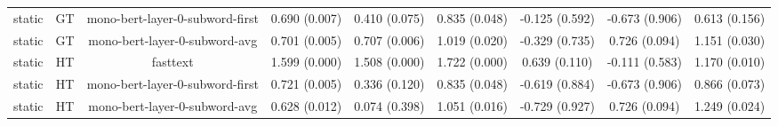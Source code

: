\begin{sidewaystable}[htb]
\begin{tabular}{@{}ccccccccc@{}}
        static & GT & mono-bert-layer-0-subword-first & 0.690 (0.007) & 0.410 (0.075) & 0.835 (0.048) & -0.125 (0.592) & -0.673 (0.906) & 0.613 (0.156) \\
        static & GT & mono-bert-layer-0-subword-avg & 0.701 (0.005) & 0.707 (0.006) & 1.019 (0.020) & -0.329 (0.735) & 0.726 (0.094) & 1.151 (0.030) \\
        static & HT & fasttext & 1.599 (0.000) & 1.508 (0.000) & 1.722 (0.000) & 0.639 (0.110) & -0.111 (0.583) & 1.170 (0.010) \\
        static & HT & mono-bert-layer-0-subword-first & 0.721 (0.005) & 0.336 (0.120) & 0.835 (0.048) & -0.619 (0.884) & -0.673 (0.906) & 0.866 (0.073) \\
        static & HT & mono-bert-layer-0-subword-avg & 0.628 (0.012) & 0.074 (0.398) & 1.051 (0.016) & -0.729 (0.927) & 0.726 (0.094) & 1.249 (0.024) \\
        \bottomrule
    \end{tabular}
\end{sidewaystable}